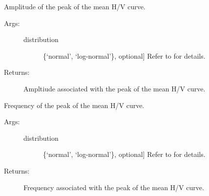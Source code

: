 \documentclass[letterpaper,10pt,english,openany,oneside]{sphinxmanual}
\begin{document}
\begin{fulllineitems}
\begin{fulllineitems}
\begin{description}
\end{description}

\end{fulllineitems}


\begin{fulllineitems}
\label{\detokenize{index:hvsrpy.Hvsr.mc_peak_amp}}
Amplitude of the peak of the mean H/V curve.
\begin{description}
\item[{Args:}] \leavevmode\begin{description}
\item[{distribution}] \leavevmode{[}\{‘normal’, ‘log-normal’\}, optional{]}
Refer to {\hyperref[\detokenize{index:hvsrpy.Hvsr.mean_curve}]{}} for details.

\end{description}

\item[{Returns:}] \leavevmode
Ampltiude associated with the peak of the mean H/V curve.

\end{description}

\end{fulllineitems}


\begin{fulllineitems}
\label{\detokenize{index:hvsrpy.Hvsr.mc_peak_frq}}
Frequency of the peak of the mean H/V curve.
\begin{description}
\item[{Args:}] \leavevmode\begin{description}
\item[{distribution}] \leavevmode{[}\{‘normal’, ‘log-normal’\}, optional{]}
Refer to {\hyperref[\detokenize{index:hvsrpy.Hvsr.mean_curve}]{}} for details.

\end{description}

\item[{Returns:}] \leavevmode
Frequency associated with the peak of the mean H/V curve.


\end{description}
\end{fulllineitems}
\end{fulllineitems}
\end{document}
